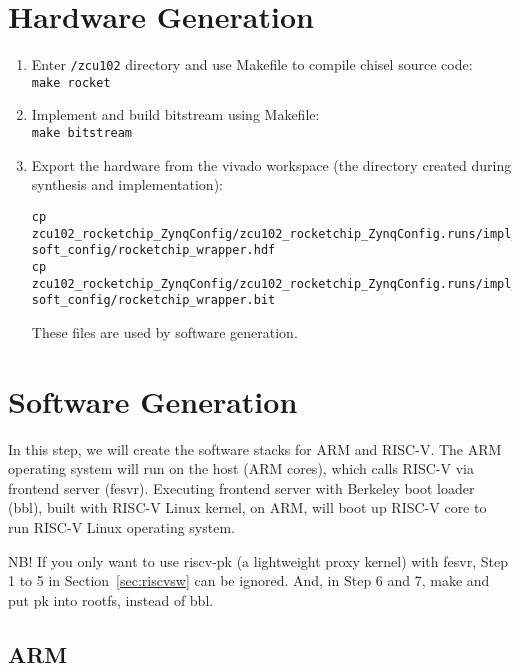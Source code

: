 \documentclass[a4paper,11pt]{article}
\begin{document}
\section{Hardware Generation}
\begin{enumerate}
\item Enter  {\tt \rootdir/zcu102} directory and use Makefile to compile chisel source code:\\
{\tt make rocket}
\item Implement and build bitstream using Makefile:\\
 {\tt make bitstream}
 

\item Export the hardware from the vivado workspace (the directory created during synthesis and implementation):
\begin{lstlisting}
cp zcu102_rocketchip_ZynqConfig/zcu102_rocketchip_ZynqConfig.runs/impl_1/rocketchip_wrapper.sysdef soft_config/rocketchip_wrapper.hdf
cp zcu102_rocketchip_ZynqConfig/zcu102_rocketchip_ZynqConfig.runs/impl_1/rocketchip_wrapper.bit soft_config/rocketchip_wrapper.bit
\end{lstlisting}
These files are used by software generation.
\end{enumerate}

\section{Software Generation}
In this step, we will create the software stacks for ARM and RISC-V. The ARM operating system will run on the host (ARM cores), which calls RISC-V via frontend server (fesvr). 
Executing frontend server with Berkeley boot loader (bbl), built with RISC-V Linux kernel, on ARM, will boot up RISC-V core to run RISC-V Linux operating system.  

NB!
If you only want to use riscv-pk (a lightweight proxy kernel) with fesvr, Step 1 to 5 in Section~\ref{sec:riscvsw} can be ignored. And, in Step 6 and 7, make and put pk into rootfs, instead of bbl. 

\subsection{ARM}\label{sec-arm}
\end{document}
